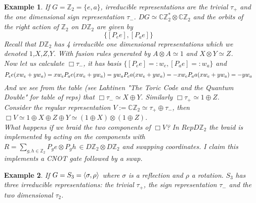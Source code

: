 \documentclass{article}
\newtheorem{example}{Example}
\begin{document}
\begin{example}
	If $G=\mathbb{Z}_2= \{e,a\}$, irreducible representations are the trivial $\tau_+$ and the one dimensional sign representation $\tau_-$. $DG \simeq \mathbb{C}\mathbb{Z}_2^* \otimes \mathbb{C}\mathbb{Z}_2$ and the orbits of the right action of $\mathbb{Z}_2$ on $D\mathbb{Z}_2$ are given by
	$$ \{ [P_ee], [P_ae] \}$$
	Recall that $D\mathbb{Z}_2$ has 4 irreducible one dimensional representations which we denoted $1$,$X$,$Z$,$Y$. With fusion rules generated by $A \otimes A \simeq 1$ and $X \otimes Y \simeq Z$. \\
	Now let us calculate $\Box \tau_-$, it has basis $\{[P_ee] =:w_e, [P_ae] =:w_a \}$ and 
	\begin{equation*}
	P_ee(xw_e + yw_a)= xw_e \\
	P_ae(xw_e + yw_a)= yw_a \\
	P_ea(xw_e + yw_a)= -xw_e \\ 
	P_aa(xw_e + yw_a)= -yw_a
	\end{equation*}
	And we see from the table (see Lahtinen "The Toric Code and the Quantum Double" for table of reps) that $\Box \tau_- \simeq X \oplus Y$. Similarly $\Box \tau_+ \simeq 1 \oplus Z$. \\
	Consider the regular representation $V := \mathbb{C}\mathbb{Z}_2 \simeq \tau_+ \oplus \tau_-$, then $\Box V \simeq 1 \oplus X \oplus Z \oplus Y \simeq (1 \oplus X) \otimes (1 \oplus Z) $.\\
	What happens if we braid the two components of $\Box V$? In $RepD\mathbb{Z}_2$ the braid is implemented by acting on the components with $R=\sum_{g,h\in\mathbb{Z}_2} P_ge \otimes P_gh \, \in D\mathbb{Z}_2\otimes D\mathbb{Z}_2$ and swapping coordinates. I claim this implements a CNOT gate followed by a swap.
\end{example}

\begin{example}
	If $G=S_3=\braket{\sigma,\rho}$ where $\sigma$ is a reflection and $\rho$ a rotation. $S_3$ has three irreducible representations: the trivial $\tau_+$, the sign representation $\tau_-$ and the two dimensional $\tau_2$.
\end{example}
\end{document}
